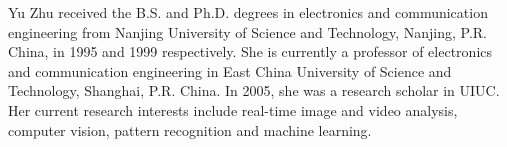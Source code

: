 \documentclass[10pt,journal]{IEEEtran}
\begin{document}

\begin{IEEEbiography}{Yu Zhu}
received the B.S. and Ph.D. degrees in electronics and communication engineering from Nanjing University of Science and Technology, Nanjing, P.R. China, in 1995 and 1999 respectively. She is currently a professor of electronics and communication engineering in East China University of Science and Technology, Shanghai, P.R. China. In 2005, she was a research scholar in UIUC. Her current research interests include real-time image and video analysis, computer vision, pattern recognition and machine learning.
\end{IEEEbiography}






\end{document}
